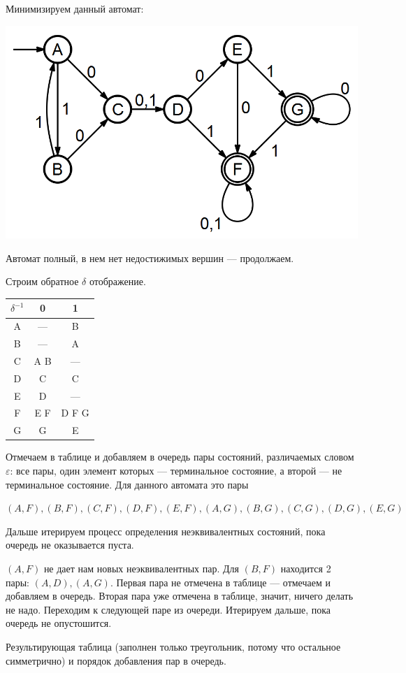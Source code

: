 \documentclass[12pt]{article}
\begin{document}
\bigskip

Минимизируем данный автомат:

\begin{center} \includegraphics[width=0.65\linewidth]{2exmin.png} \end{center}

Автомат полный, в нем нет недостижимых вершин --- продолжаем.

Строим обратное $\delta$ отображение. 

\begin{tabular}{c|c|c}
$\delta^{-1}$ & 0 & 1 \\ \hline
A & --- & B \\
B & --- & A \\
C & A B & --- \\
D & C & C \\
E & D & --- \\
F & E F & D F G \\
G & G & E 
\end{tabular}

Отмечаем в таблице и добавляем в очередь пары состояний, различаемых словом $\varepsilon$: все пары, один элемент которых --- терминальное состояние, а второй --- не терминальное состояние. Для данного автомата это пары 

$(A, F), (B, F), (C, F), (D, F), (E,F), (A, G), (B, G), (C, G), (D, G), (E, G)$

Дальше итерируем процесс определения неэквивалентных состояний, пока очередь не оказывается пуста. 

$(A, F)$ не дает нам новых неэквивалентных пар. Для $(B, F)$ находится 2 пары: $(A, D), (A, G)$. Первая пара не отмечена в таблице --- отмечаем и добавляем в очередь. Вторая пара уже отмечена в таблице, значит, ничего делать не надо. Переходим к следующей паре из очереди. Итерируем дальше, пока очередь не опустошится. 

Результирующая таблица (заполнен только треугольник, потому что остальное симметрично) и порядок добавления пар в очередь.
\end{document}
